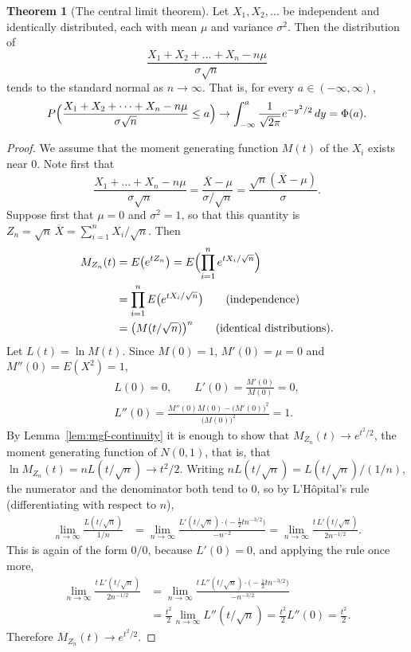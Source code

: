 \documentclass[11pt,a4paper]{article}
\theoremstyle{definition}
\newtheorem{thm}{Theorem}[subsection]
\begin{document}
\begin{thm}[The central limit theorem]\label{thm:clt}
Let $X_1, X_2, \dots$ be independent and identically distributed, each with mean $\mu$ and variance $\sigma^2$. Then the distribution of
\[
\frac{X_1 + X_2 + \dots + X_n - n\mu}{\sigma\sqrt n}
\]
tends to the standard normal as $n \to \infty$. That is, for every $a \in (-\infty, \infty)$,
\[
P\Bigl(\frac{X_1 + X_2 + \dots + X_n - n\mu}{\sigma\sqrt n} \le a\Bigr) \to \int_{-\infty}^a\frac{1}{\sqrt{2\pi}}e^{-y^2/2}\,dy = \Phi(a) .
\]
\end{thm}

\begin{proof}
We assume that the moment generating function $M(t)$ of the $X_i$ exists near $0$. Note first that
\[
\frac{X_1 + \dots + X_n - n\mu}{\sigma\sqrt n} = \frac{\overline X - \mu}{\sigma/\sqrt n} = \frac{\sqrt n(\overline X - \mu)}{\sigma} .
\]
Suppose first that $\mu = 0$ and $\sigma^2 = 1$, so that this quantity is $Z_n = \sqrt n\,\overline X = \sum_{i=1}^nX_i/\sqrt n$. Then
\begin{align*}
M_{Z_n}(t) &= E\bigl(e^{tZ_n}\bigr) = E\Bigl(\prod_{i=1}^ne^{tX_i/\sqrt n}\Bigr) \\
&= \prod_{i=1}^nE\bigl(e^{tX_i/\sqrt n}\bigr) \qquad\text{(independence)} \\
&= \bigl(M(t/\sqrt n)\bigr)^n \qquad\text{(identical distributions).}
\end{align*}
Let $L(t) = \ln M(t)$. Since $M(0) = 1$, $M'(0) = \mu = 0$ and $M''(0) = E(X^2) = 1$,
\begin{gather*}
L(0) = 0 , \qquad L'(0) = \frac{M'(0)}{M(0)} = 0 , \\
L''(0) = \frac{M''(0)M(0) - \bigl(M'(0)\bigr)^2}{\bigl(M(0)\bigr)^2} = 1 .
\end{gather*}
By Lemma~\ref{lem:mgf-continuity} it is enough to show that $M_{Z_n}(t) \to e^{t^2/2}$, the moment generating function of $N(0, 1)$, that is, that
$\ln M_{Z_n}(t) = nL(t/\sqrt n) \to t^2/2$. Writing $nL(t/\sqrt n) = L(t/\sqrt n)/(1/n)$, the numerator and the denominator both tend to $0$, so by L'H\^opital's rule
(differentiating with respect to $n$),
\begin{align*}
\lim_{n\to\infty}\frac{L(t/\sqrt n)}{1/n} &= \lim_{n\to\infty}\frac{L'(t/\sqrt n)\cdot\bigl(-\frac12tn^{-3/2}\bigr)}{-n^{-2}} = \lim_{n\to\infty}\frac{t\,L'(t/\sqrt n)}{2n^{-1/2}} .
\end{align*}
This is again of the form $0/0$, because $L'(0) = 0$, and applying the rule once more,
\begin{align*}
\lim_{n\to\infty}\frac{t\,L'(t/\sqrt n)}{2n^{-1/2}} &= \lim_{n\to\infty}\frac{t\,L''(t/\sqrt n)\cdot\bigl(-\frac12tn^{-3/2}\bigr)}{-n^{-3/2}} \\
&= \frac{t^2}{2}\lim_{n\to\infty}L''(t/\sqrt n) = \frac{t^2}{2}L''(0) = \frac{t^2}{2} .
\end{align*}
Therefore $M_{Z_n}(t) \to e^{t^2/2}$.


\end{proof}
\end{document}
